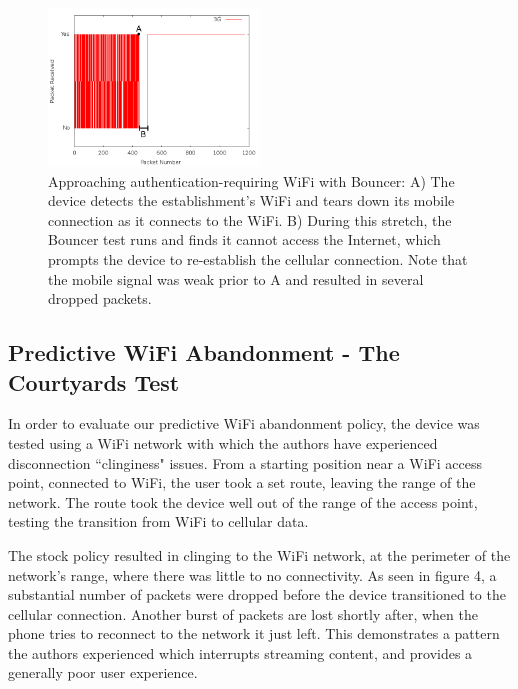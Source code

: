 \begin{figure}
	\includegraphics[width=0.5\textwidth]{paneraWithPolicy}
	\caption{Approaching authentication-requiring WiFi with Bouncer: A) The device detects the establishment's WiFi and tears down its mobile connection as it connects to the WiFi. B) During this stretch, the Bouncer test runs and finds it cannot access the Internet, which prompts the device to re-establish the cellular connection. Note that the mobile signal was weak prior to A and resulted in several dropped packets.}
\end{figure}

\subsection{Predictive WiFi Abandonment - The Courtyards Test}
In order to evaluate our predictive WiFi abandonment policy, the device was tested using a WiFi network with which the authors have experienced disconnection ``clinginess" issues. From a starting position near a WiFi access point, connected to WiFi, the user took a set route, leaving the range of the network. The route took the device well out of the range of the access point, testing the transition from WiFi to cellular data.

The stock policy resulted in clinging to the WiFi network, at the perimeter of the network's range, where there was little to no connectivity. As seen in figure 4, a substantial number of packets were dropped before the device transitioned to the cellular connection. Another burst of packets are lost shortly after, when the phone tries to reconnect to the network it just left. This demonstrates a pattern the authors experienced which interrupts streaming content, and provides a generally poor user experience.

